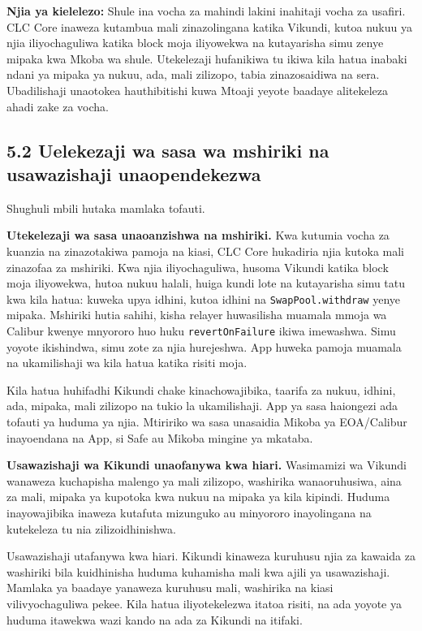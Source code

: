 \documentclass[11pt]{article}
\begin{document}
\textbf{Njia ya kielelezo:} Shule ina vocha za mahindi lakini inahitaji vocha za usafiri. CLC Core inaweza kutambua mali zinazolingana katika Vikundi, kutoa nukuu ya njia iliyochaguliwa katika block moja iliyowekwa na kutayarisha simu zenye mipaka kwa Mkoba wa shule. Utekelezaji hufanikiwa tu ikiwa kila hatua inabaki ndani ya mipaka ya nukuu, ada, mali zilizopo, tabia zinazosaidiwa na sera. Ubadilishaji unaotokea hauthibitishi kuwa Mtoaji yeyote baadaye alitekeleza ahadi zake za vocha.

\subsection*{5.2 Uelekezaji wa sasa wa mshiriki na usawazishaji unaopendekezwa}

Shughuli mbili hutaka mamlaka tofauti.

\textbf{Utekelezaji wa sasa unaoanzishwa na mshiriki.} Kwa kutumia vocha za kuanzia na zinazotakiwa pamoja na kiasi, CLC Core hukadiria njia kutoka mali zinazofaa za mshiriki. Kwa njia iliyochaguliwa, husoma Vikundi katika block moja iliyowekwa, hutoa nukuu halali, huiga kundi lote na kutayarisha simu tatu kwa kila hatua: kuweka upya idhini, kutoa idhini na \texttt{SwapPool.withdraw} yenye mipaka. Mshiriki hutia sahihi, kisha relayer huwasilisha muamala mmoja wa Calibur kwenye mnyororo huo huku \texttt{revertOnFailure} ikiwa imewashwa. Simu yoyote ikishindwa, simu zote za njia hurejeshwa. App huweka pamoja muamala na ukamilishaji wa kila hatua katika risiti moja.

Kila hatua huhifadhi Kikundi chake kinachowajibika, taarifa za nukuu, idhini, ada, mipaka, mali zilizopo na tukio la ukamilishaji. App ya sasa haiongezi ada tofauti ya huduma ya njia. Mtiririko wa sasa unasaidia Mikoba ya EOA/Calibur inayoendana na App, si Safe au Mikoba mingine ya mkataba.

\textbf{Usawazishaji wa Kikundi unaofanywa kwa hiari.} Wasimamizi wa Vikundi wanaweza kuchapisha malengo ya mali zilizopo, washirika wanaoruhusiwa, aina za mali, mipaka ya kupotoka kwa nukuu na mipaka ya kila kipindi. Huduma inayowajibika inaweza kutafuta mizunguko au minyororo inayolingana na kutekeleza tu nia zilizoidhinishwa.

Usawazishaji utafanywa kwa hiari. Kikundi kinaweza kuruhusu njia za kawaida za washiriki bila kuidhinisha huduma kuhamisha mali kwa ajili ya usawazishaji. Mamlaka ya baadaye yanaweza kuruhusu mali, washirika na kiasi vilivyochaguliwa pekee. Kila hatua iliyotekelezwa itatoa risiti, na ada yoyote ya huduma itawekwa wazi kando na ada za Kikundi na itifaki.
\end{document}
